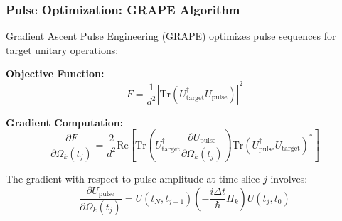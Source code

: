 \documentclass[12pt,a4paper]{article}
\begin{document}
\subsubsection{Pulse Optimization: GRAPE Algorithm}

Gradient Ascent Pulse Engineering (GRAPE) optimizes pulse sequences for target unitary operations:

\textbf{Objective Function:}
\begin{equation}
F = \frac{1}{d^2}\left|\text{Tr}\left(U_{\text{target}}^\dagger U_{\text{pulse}}\right)\right|^2
\label{eq:grape-fidelity}
\end{equation}

\textbf{Gradient Computation:}
\begin{equation}
\frac{\partial F}{\partial \Omega_k(t_j)} = \frac{2}{d^2} \text{Re}\left[\text{Tr}\left(U_{\text{target}}^\dagger \frac{\partial U_{\text{pulse}}}{\partial \Omega_k(t_j)}\right) \text{Tr}\left(U_{\text{pulse}}^\dagger U_{\text{target}}\right)^*\right]
\label{eq:grape-gradient}
\end{equation}

The gradient with respect to pulse amplitude at time slice $j$ involves:
\begin{equation}
\frac{\partial U_{\text{pulse}}}{\partial \Omega_k(t_j)} = U(t_N, t_{j+1}) \left(-\frac{i\Delta t}{\hbar} H_k\right) U(t_j, t_0)
\label{eq:grape-unitary-grad}
\end{equation}
\end{document}

